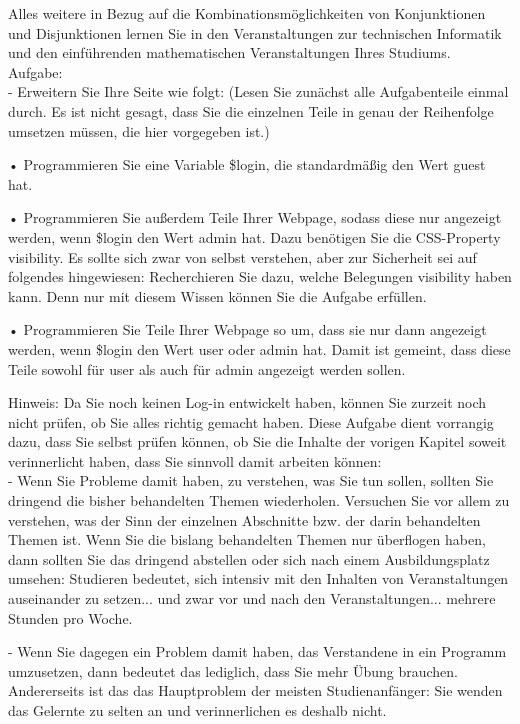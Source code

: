 Alles weitere in Bezug auf die Kombinationsmöglichkeiten von Konjunktionen und Disjunktionen lernen Sie in den Veranstaltungen zur technischen Informatik und den einführenden mathematischen Veranstaltungen Ihres Studiums.\\

Aufgabe:\\

-	Erweitern Sie Ihre Seite wie folgt: (Lesen Sie zunächst alle Aufgabenteile einmal durch. Es ist nicht gesagt, dass Sie die einzelnen Teile in genau der Reihenfolge umsetzen müssen, die hier vorgegeben ist.)

•	Programmieren Sie eine Variable \$login, die standardmäßig den Wert guest hat.

•	Programmieren Sie außerdem  Teile Ihrer Webpage, sodass diese nur angezeigt werden, wenn \$login den Wert admin hat. Dazu benötigen Sie die CSS-Property visibility. Es sollte sich zwar von selbst verstehen, aber zur Sicherheit sei auf folgendes hingewiesen: Recherchieren Sie dazu, welche Belegungen visibility haben kann. Denn nur mit diesem Wissen können Sie die Aufgabe erfüllen.

•	Programmieren Sie Teile Ihrer Webpage so um, dass sie nur dann angezeigt werden, wenn \$login den Wert user oder admin hat. Damit ist gemeint, dass diese Teile sowohl für user als auch für admin angezeigt werden sollen.

Hinweis: Da Sie noch keinen Log-in entwickelt haben, können Sie zurzeit noch nicht prüfen, ob Sie alles richtig gemacht haben. Diese Aufgabe dient vorrangig dazu, dass Sie selbst prüfen können, ob Sie die Inhalte der vorigen Kapitel soweit verinnerlicht haben, dass Sie sinnvoll damit arbeiten können:\\

-	Wenn Sie Probleme damit haben, zu verstehen, was Sie tun sollen, sollten Sie dringend die bisher behandelten Themen wiederholen. Versuchen Sie vor allem zu verstehen, was der Sinn der einzelnen Abschnitte bzw. der darin behandelten Themen ist. Wenn Sie die bislang behandelten Themen nur überflogen haben, dann sollten Sie das dringend abstellen oder sich nach einem Ausbildungsplatz umsehen: Studieren bedeutet, sich intensiv mit den Inhalten von Veranstaltungen auseinander zu setzen... und zwar vor und nach den Veranstaltungen... mehrere Stunden pro Woche.

-	Wenn Sie dagegen ein Problem damit haben, das Verstandene in ein Programm umzusetzen, dann bedeutet das lediglich, dass Sie mehr Übung brauchen. Andererseits ist das das Hauptproblem der meisten Studienanfänger: Sie wenden das Gelernte zu selten an und verinnerlichen es deshalb nicht.

